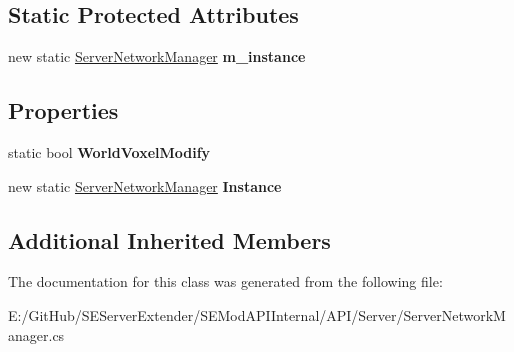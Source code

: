 \subsection*{Static Protected Attributes}
\begin{DoxyCompactItemize}
\item 
\hypertarget{class_s_e_mod_a_p_i_internal_1_1_a_p_i_1_1_server_1_1_server_network_manager_aff91658544b042ef59d2970d1a22acea}{}new static \hyperlink{class_s_e_mod_a_p_i_internal_1_1_a_p_i_1_1_server_1_1_server_network_manager}{Server\+Network\+Manager} {\bfseries m\+\_\+instance}\label{class_s_e_mod_a_p_i_internal_1_1_a_p_i_1_1_server_1_1_server_network_manager_aff91658544b042ef59d2970d1a22acea}

\end{DoxyCompactItemize}
\subsection*{Properties}
\begin{DoxyCompactItemize}
\item 
\hypertarget{class_s_e_mod_a_p_i_internal_1_1_a_p_i_1_1_server_1_1_server_network_manager_ad57755bce4230ca2c3ec31b999e600c9}{}static bool {\bfseries World\+Voxel\+Modify}\label{class_s_e_mod_a_p_i_internal_1_1_a_p_i_1_1_server_1_1_server_network_manager_ad57755bce4230ca2c3ec31b999e600c9}

\item 
\hypertarget{class_s_e_mod_a_p_i_internal_1_1_a_p_i_1_1_server_1_1_server_network_manager_aac2825b37f5374de9c3853ec9b8eb1fd}{}new static \hyperlink{class_s_e_mod_a_p_i_internal_1_1_a_p_i_1_1_server_1_1_server_network_manager}{Server\+Network\+Manager} {\bfseries Instance}\label{class_s_e_mod_a_p_i_internal_1_1_a_p_i_1_1_server_1_1_server_network_manager_aac2825b37f5374de9c3853ec9b8eb1fd}

\end{DoxyCompactItemize}
\subsection*{Additional Inherited Members}


The documentation for this class was generated from the following file\+:\begin{DoxyCompactItemize}
\item 
E\+:/\+Git\+Hub/\+S\+E\+Server\+Extender/\+S\+E\+Mod\+A\+P\+I\+Internal/\+A\+P\+I/\+Server/Server\+Network\+Manager.\+cs\end{DoxyCompactItemize}
